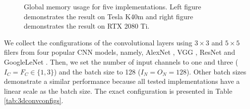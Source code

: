 \begin{figure}
\centering
{}
\hspace{0em}

\caption{Global memory usage for five implementations. Left figure demonstrates the result on Tesla K40m and right figure demonstrates the result on RTX 2080 Ti.}
\label{fig:3dmem}
\end{figure}

We collect the configurations of the convolutional layers using $3 \times 3$ and $5 \times 5$ filers from four popular CNN models,
namely, AlexNet \cite{Krizhevsky2012ImageNet}, VGG \cite{SimonyanZ14a}, ResNet \cite{HeZRS16} and GoogleLeNet \cite{SzegedyLJSRAEVR15}.
Then, we set the number of input channels to one and three ($I_C=F_C \in \{1, 3\}$) and the batch size to 128 ($I_N=O_N=128$). Other batch
sizes demonstrate a similar performance because all tested implementations have a linear scale as the batch size. The exact configuration is presented in Table \ref{tab:3dconvconfigs}.

